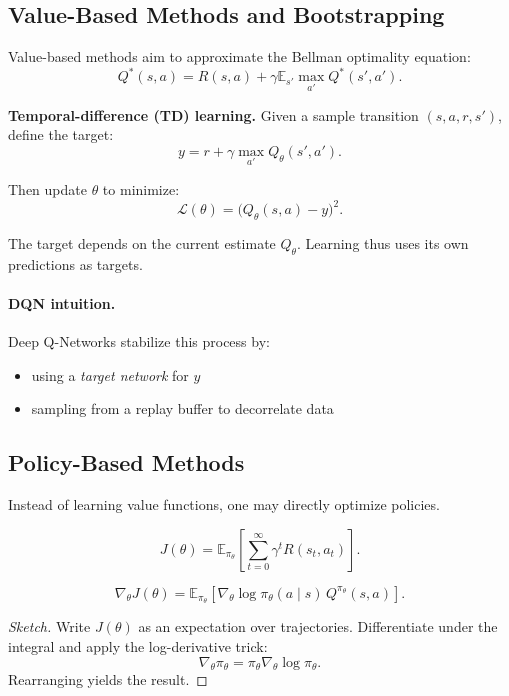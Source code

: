 \subsection{Value-Based Methods and Bootstrapping}

Value-based methods aim to approximate the Bellman optimality equation:
\[
Q^*(s,a) = R(s,a) + \gamma \mathbb{E}_{s'} \max_{a'} Q^*(s',a').
\]

\medskip

\noindent
\textbf{Temporal-difference (TD) learning.}  
Given a sample transition $(s,a,r,s')$, define the target:
\[
y = r + \gamma \max_{a'} Q_\theta(s',a').
\]

Then update $\theta$ to minimize:
\[
\mathcal{L}(\theta) = \bigl(Q_\theta(s,a) - y\bigr)^2.
\]

\begin{remark}[Bootstrapping]
The target depends on the current estimate $Q_\theta$.  
Learning thus uses its own predictions as targets.
\end{remark}

\paragraph{DQN intuition.}
Deep Q-Networks stabilize this process by:
\begin{itemize}
\item using a \emph{target network} for $y$
\item sampling from a replay buffer to decorrelate data
\end{itemize}

\subsection{Policy-Based Methods}

Instead of learning value functions, one may directly optimize policies.

\begin{definition}[Objective]
\[
J(\theta) = \mathbb{E}_{\pi_\theta}\left[ \sum_{t=0}^\infty \gamma^t R(s_t, a_t) \right].
\]
\end{definition}

\begin{theorem}
\[
\nabla_\theta J(\theta)
=
\mathbb{E}_{\pi_\theta}
\left[
\nabla_\theta \log \pi_\theta(a \mid s)\, Q^{\pi_\theta}(s,a)
\right].
\]
\end{theorem}

\begin{proof}[Sketch]
Write $J(\theta)$ as an expectation over trajectories.  
Differentiate under the integral and apply the log-derivative trick:
\[
\nabla_\theta \pi_\theta = \pi_\theta \nabla_\theta \log \pi_\theta.
\]
Rearranging yields the result.
\end{proof}

